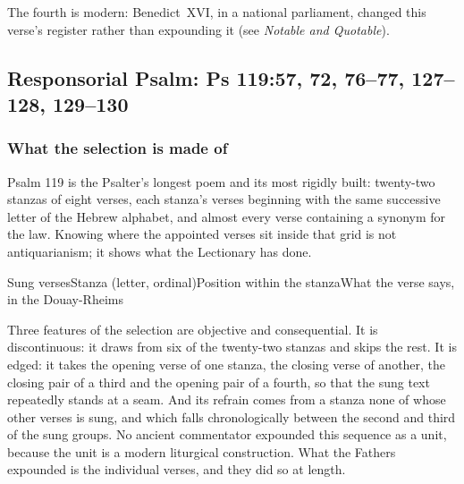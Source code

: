 The fourth is modern: Benedict~XVI, in a national parliament, changed this verse's register rather than expounding it (see \emph{Notable and Quotable}).

\subsection*{Responsorial Psalm: Ps 119:57, 72, 76--77, 127--128, 129--130}

\subsubsection*{What the selection is made of}

Psalm 119 is the Psalter's longest poem and its most rigidly built: twenty-two stanzas of eight verses, each stanza's verses beginning with the same successive letter of the Hebrew alphabet, and almost every verse containing a synonym for the law. Knowing where the appointed verses sit inside that grid is not antiquarianism; it shows what the Lectionary has done.

\begin{fourcoltable}{Sung verses}{Stanza (letter, ordinal)}{Position within the stanza}{What the verse says, in the Douay-Rheims}
\end{fourcoltable}

Three features of the selection are objective and consequential. It is discontinuous: it draws from six of the twenty-two stanzas and skips the rest. It is edged: it takes the opening verse of one stanza, the closing verse of another, the closing pair of a third and the opening pair of a fourth, so that the sung text repeatedly stands at a seam. And its refrain comes from a stanza none of whose other verses is sung, and which falls chronologically between the second and third of the sung groups. No ancient commentator expounded this sequence as a unit, because the unit is a modern liturgical construction. What the Fathers expounded is the individual verses, and they did so at length.

